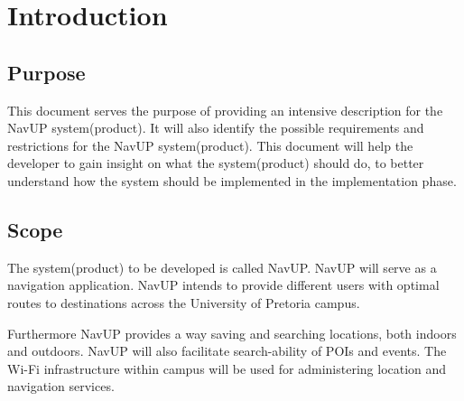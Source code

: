 ﻿\documentclass{article}
\begin{document}

\pagebreak
\tableofcontents
\pagebreak
\section{Introduction}
    \subsection{Purpose}
		\begin{flushleft}
			This document serves the purpose of providing an intensive description for the NavUP system(product). It will also identify the possible requirements and restrictions for the NavUP system(product). This document will help the developer to gain insight on what the system(product) should do, to better understand how the system should be implemented in the implementation phase.
		\end{flushleft}
    \subsection{Scope}
		\begin{flushleft}
			The system(product) to be developed is called NavUP. NavUP will serve as a navigation application. NavUP intends to provide different users with optimal routes to destinations across the University of Pretoria campus.
			
			Furthermore NavUP provides a way saving and searching locations, both indoors and outdoors. NavUP will also facilitate search-ability of POIs and events. The Wi-Fi infrastructure within campus will be used for administering location and navigation services.
		\end{flushleft}
\end{document}
